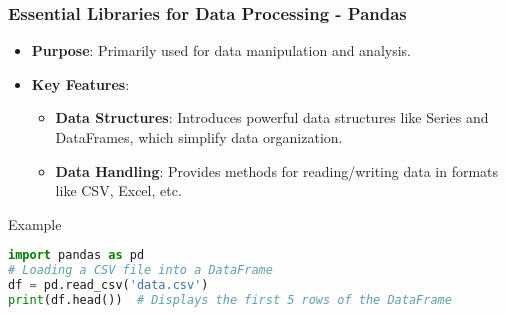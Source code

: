 \documentclass[aspectratio=169]{beamer}
\begin{document}
\begin{frame}[fragile]
    \frametitle{Essential Libraries for Data Processing - Pandas}
    \begin{itemize}
        \item \textbf{Purpose}: Primarily used for data manipulation and analysis.
        \item \textbf{Key Features}:
        \begin{itemize}
            \item \textbf{Data Structures}: Introduces powerful data structures like Series and DataFrames, which simplify data organization.
            \item \textbf{Data Handling}: Provides methods for reading/writing data in formats like CSV, Excel, etc.
        \end{itemize}
    \end{itemize}
    \begin{block}{Example}
    \begin{lstlisting}[language=Python]
import pandas as pd
# Loading a CSV file into a DataFrame
df = pd.read_csv('data.csv')
print(df.head())  # Displays the first 5 rows of the DataFrame
    \end{lstlisting}
    \end{block}
\end{frame}
\end{document}
